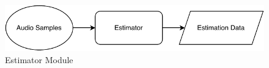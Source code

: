 \begin{figure}[H]
    \begin{center}
    \includegraphics[width=\textwidth]{figures/approach/figEstimator.pdf}
    \end{center}
    \caption[Estimator Module]{Estimator Module}
    \label{fig:estimator}
\end{figure}
